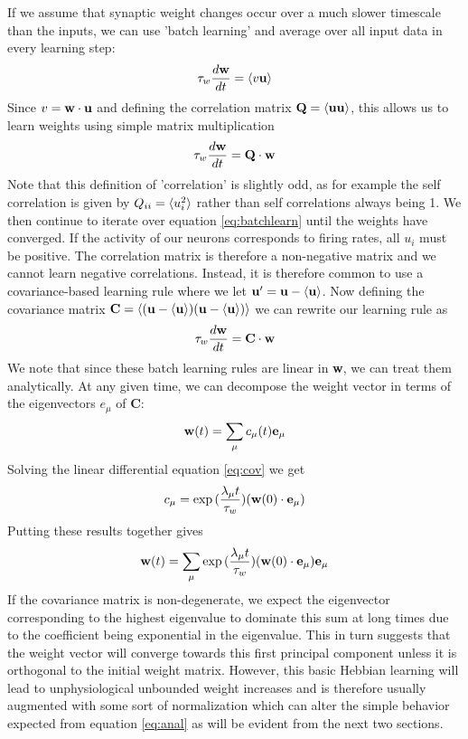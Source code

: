 \documentclass{article}
\begin{document}
If we assume that synaptic weight changes occur over a much slower timescale than the inputs, we can use 'batch learning' and average over all input data in every learning step:
\begin{equation}
\tau_w \dfrac{d\bf{w}}{dt} = \braket{v \bf{u}}
\end{equation}
Since $v = \bf{w} \cdot \bf{u} $ and defining the correlation matrix ${\bf Q} = \braket{{\bf u u} }$, this allows us to learn weights using simple matrix multiplication
\begin{equation}\label{eq:batchlearn}
\tau_w \dfrac{d\bf{w}}{dt} = \bf Q \cdot w
\end{equation}
Note that this definition of 'correlation' is slightly odd, as for example the self correlation is given by $Q_{ii} = \braket{u_i^2}$ rather than self correlations always being 1.
We then continue to iterate over equation \ref{eq:batchlearn} until the weights have converged. If the activity of our neurons corresponds to firing rates, all $u_i$ must be positive. The correlation matrix is therefore a non-negative matrix and we cannot learn negative correlations. Instead, it is therefore common to use a covariance-based learning rule where we let $\bf u' = u-\braket{u}$. Now defining the covariance matrix ${\bf C} = \braket{( {\bf u} - \braket{\bf u})  ( {\bf u} - \braket{\bf u})}$ we can rewrite our learning rule as
\begin{equation}\label{eq:cov}
\tau_w \dfrac{d\bf{w}}{dt} = \bf C \cdot w
\end{equation}
We note that since these batch learning rules are linear in \textbf{w}, we can treat them analytically.
At any given time, we can decompose the weight vector in terms of the eigenvectors $e_\mu$ of \textbf{C}:
\begin{equation}
{\bf w}(t) = \sum_\mu{ c_\mu(t) {\bf e}_\mu }
\end{equation}
Solving the linear differential equation \ref{eq:cov} we get
\begin{equation}
c_\mu = \exp{( \dfrac{\lambda_\mu t}{\tau_w})}({\bf w}(0) \cdot {\bf e_\mu})
\end{equation}
Putting these results together gives
\begin{equation}\label{eq:anal}
{\bf w}(t) = \sum_\mu{ \exp{( \dfrac{\lambda_\mu t}{\tau_w})}({\bf w}(0) \cdot {\bf e_\mu})  {\bf e}_\mu}
\end{equation}
If the covariance matrix is non-degenerate, we expect the eigenvector corresponding to the highest eigenvalue to dominate this sum at long times due to the coefficient being exponential in the eigenvalue. This in turn suggests that the weight vector will converge towards this first principal component unless it is orthogonal to the initial weight matrix.
However, this basic Hebbian learning will lead to unphysiological unbounded weight increases and is therefore usually augmented with some sort of normalization which can alter the simple behavior expected from equation \ref{eq:anal} as will be evident from the next two sections.
\end{document}
